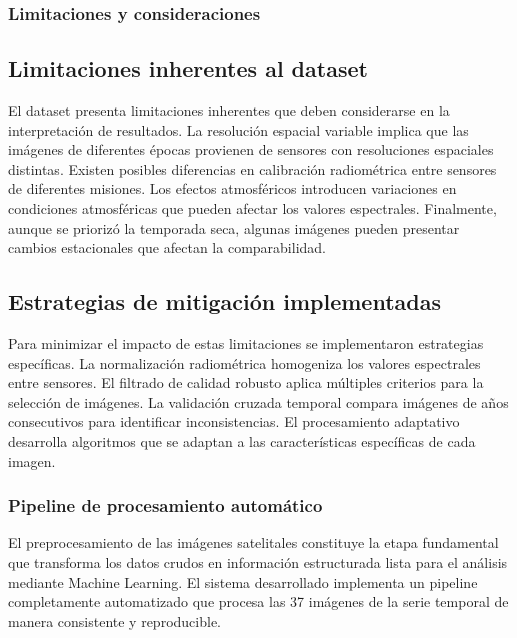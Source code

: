 \subsubsection{Limitaciones y consideraciones}

\subsection{Limitaciones inherentes al dataset}

El dataset presenta limitaciones inherentes que deben considerarse en la interpretación de resultados. La resolución espacial variable implica que las imágenes de diferentes épocas provienen de sensores con resoluciones espaciales distintas. Existen posibles diferencias en calibración radiométrica entre sensores de diferentes misiones. Los efectos atmosféricos introducen variaciones en condiciones atmosféricas que pueden afectar los valores espectrales. Finalmente, aunque se priorizó la temporada seca, algunas imágenes pueden presentar cambios estacionales que afectan la comparabilidad.

\subsection{Estrategias de mitigación implementadas}

Para minimizar el impacto de estas limitaciones se implementaron estrategias específicas. La normalización radiométrica homogeniza los valores espectrales entre sensores. El filtrado de calidad robusto aplica múltiples criterios para la selección de imágenes. La validación cruzada temporal compara imágenes de años consecutivos para identificar inconsistencias. El procesamiento adaptativo desarrolla algoritmos que se adaptan a las características específicas de cada imagen.

\subsubsection{Pipeline de procesamiento automático}

El preprocesamiento de las imágenes satelitales constituye la etapa fundamental que transforma los datos crudos en información estructurada lista para el análisis mediante Machine Learning. El sistema desarrollado implementa un pipeline completamente automatizado que procesa las 37 imágenes de la serie temporal de manera consistente y reproducible.

